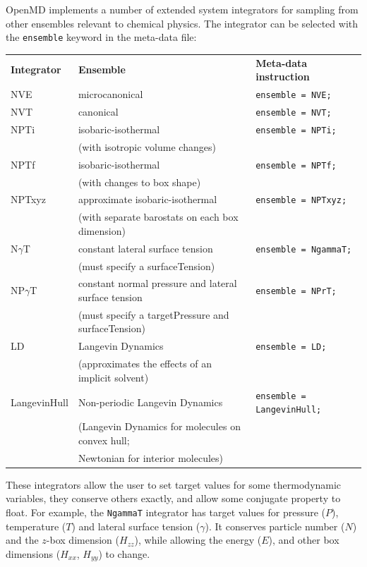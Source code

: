 \documentclass[letterpaper]{report}
\begin{document}
OpenMD implements a number of extended system integrators for
sampling from other ensembles relevant to chemical physics.  The
integrator can be selected with the {\tt ensemble} keyword in the
meta-data file:

\begin{center}
\begin{tabular}{lll}
{\bf Integrator} & {\bf Ensemble} & {\bf Meta-data instruction} \\
NVE & microcanonical & {\tt ensemble = NVE; } \\
NVT & canonical & {\tt ensemble = NVT; } \\
NPTi & isobaric-isothermal & {\tt ensemble = NPTi;} \\
  &  (with isotropic volume changes) & \\
NPTf & isobaric-isothermal & {\tt ensemble = NPTf;} \\
  & (with changes to box shape) & \\
NPTxyz & approximate isobaric-isothermal & {\tt ensemble = NPTxyz;} \\
 &  (with separate barostats on each box dimension) & \\
N$\gamma$T & constant lateral surface tension & {\tt ensemble = NgammaT;} \\
 &  (must specify a surfaceTension) & \\
NP$\gamma$T & constant normal pressure and lateral surface tension & {\tt ensemble = NPrT;} \\
 &  (must specify a targetPressure and surfaceTension) & \\
LD & Langevin Dynamics & {\tt ensemble = LD;} \\
 &  (approximates the effects of an implicit solvent) & \\
 LangevinHull & Non-periodic Langevin Dynamics  & {\tt ensemble = LangevinHull;} \\
 & (Langevin Dynamics for molecules on convex hull;\\
 & Newtonian for interior molecules) & \\
\end{tabular}
\end{center}

These integrators allow the user to set target values for some
thermodynamic variables, they conserve others exactly, and allow some
conjugate property to float. For example, the {\tt NgammaT} integrator
has target values for pressure ($P$), temperature ($T$) and lateral
surface tension ($\gamma$).  It conserves particle number ($N$) and
the $z$-box dimension ($H_{zz}$), while allowing the energy ($E$), and
other box dimensions ($H_{xx}$, $H_{yy}$) to change.
\end{document}
